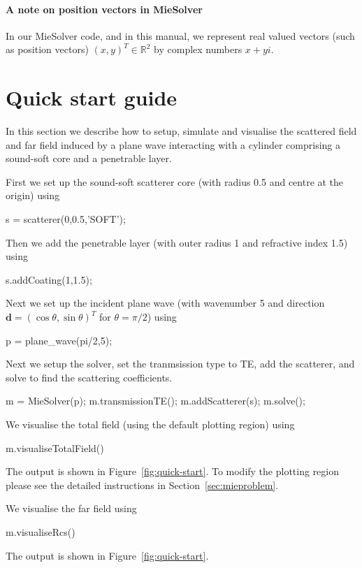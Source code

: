 \documentclass[11pt,letterpaper]{article}
\newcommand{\dd}{\boldsymbol{d}}
\newcommand{\bbR}{\mathbb{R}}
\begin{document}
\paragraph{A note on position vectors in MieSolver}

In our MieSolver code, and in this manual,
we represent real valued vectors (such as position vectors)
$(x,y)^T \in \bbR^2$  by 
complex numbers $x+yi$.

\section{Quick start guide}
\label{sec:start}

In this section we describe how to setup, simulate and visualise
the scattered field and far field induced by a plane wave interacting
with a cylinder comprising a sound-soft core and a penetrable layer.

First we set up the sound-soft
scatterer core (with radius 0.5 and centre at the origin)
using
\begin{matlab}
s = scatterer(0,0.5,'SOFT');
\end{matlab}
Then we add the penetrable layer (with outer radius 1 and refractive
index 1.5) using
\begin{matlab}
s.addCoating(1,1.5);
\end{matlab}

Next we set up the incident plane wave (with wavenumber 5 and direction
$\dd = (\cos \theta,\sin \theta)^T$ for $\theta = \pi/2$) using
\begin{matlab}
p = plane_wave(pi/2,5);
\end{matlab}

Next we setup the solver, set the tranmsission type to TE,
add the scatterer,
and solve to find the scattering coefficients.
\begin{matlab}
m = MieSolver(p);
m.transmissionTE();
m.addScatterer(s);
m.solve();
\end{matlab}

We visualise the total field (using the default plotting region) using
\begin{matlab}
m.visualiseTotalField()
\end{matlab}
The output is shown in Figure~\ref{fig:quick-start}.
To modify the plotting region please see the detailed instructions in
Section~\ref{sec:mieproblem}.

We visualise the far field using
\begin{matlab}
m.visualiseRcs()
\end{matlab}
The output is shown in Figure~\ref{fig:quick-start}.
\end{document}
